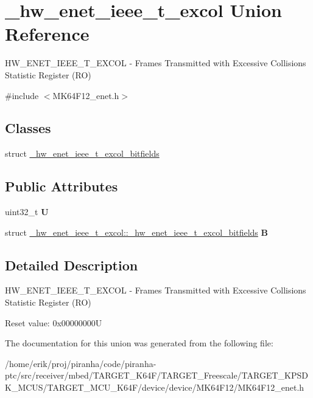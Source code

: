 \hypertarget{union__hw__enet__ieee__t__excol}{}\section{\+\_\+hw\+\_\+enet\+\_\+ieee\+\_\+t\+\_\+excol Union Reference}
\label{union__hw__enet__ieee__t__excol}


H\+W\+\_\+\+E\+N\+E\+T\+\_\+\+I\+E\+E\+E\+\_\+\+T\+\_\+\+E\+X\+C\+OL -\/ Frames Transmitted with Excessive Collisions Statistic Register (RO)  




{\ttfamily \#include $<$M\+K64\+F12\+\_\+enet.\+h$>$}

\subsection*{Classes}
\begin{DoxyCompactItemize}
\item 
struct \hyperlink{struct__hw__enet__ieee__t__excol_1_1__hw__enet__ieee__t__excol__bitfields}{\+\_\+hw\+\_\+enet\+\_\+ieee\+\_\+t\+\_\+excol\+\_\+bitfields}
\end{DoxyCompactItemize}
\subsection*{Public Attributes}
\begin{DoxyCompactItemize}
\item 
uint32\+\_\+t {\bfseries U}\hypertarget{union__hw__enet__ieee__t__excol_a671d5bff5b411f52ec5d8bb32add98c9}{}\label{union__hw__enet__ieee__t__excol_a671d5bff5b411f52ec5d8bb32add98c9}

\item 
struct \hyperlink{struct__hw__enet__ieee__t__excol_1_1__hw__enet__ieee__t__excol__bitfields}{\+\_\+hw\+\_\+enet\+\_\+ieee\+\_\+t\+\_\+excol\+::\+\_\+hw\+\_\+enet\+\_\+ieee\+\_\+t\+\_\+excol\+\_\+bitfields} {\bfseries B}\hypertarget{union__hw__enet__ieee__t__excol_ad9f384c36f14086956c929325b8d9b33}{}\label{union__hw__enet__ieee__t__excol_ad9f384c36f14086956c929325b8d9b33}

\end{DoxyCompactItemize}


\subsection{Detailed Description}
H\+W\+\_\+\+E\+N\+E\+T\+\_\+\+I\+E\+E\+E\+\_\+\+T\+\_\+\+E\+X\+C\+OL -\/ Frames Transmitted with Excessive Collisions Statistic Register (RO) 

Reset value\+: 0x00000000U 

The documentation for this union was generated from the following file\+:\begin{DoxyCompactItemize}
\item 
/home/erik/proj/piranha/code/piranha-\/ptc/src/receiver/mbed/\+T\+A\+R\+G\+E\+T\+\_\+\+K64\+F/\+T\+A\+R\+G\+E\+T\+\_\+\+Freescale/\+T\+A\+R\+G\+E\+T\+\_\+\+K\+P\+S\+D\+K\+\_\+\+M\+C\+U\+S/\+T\+A\+R\+G\+E\+T\+\_\+\+M\+C\+U\+\_\+\+K64\+F/device/device/\+M\+K64\+F12/M\+K64\+F12\+\_\+enet.\+h\end{DoxyCompactItemize}
